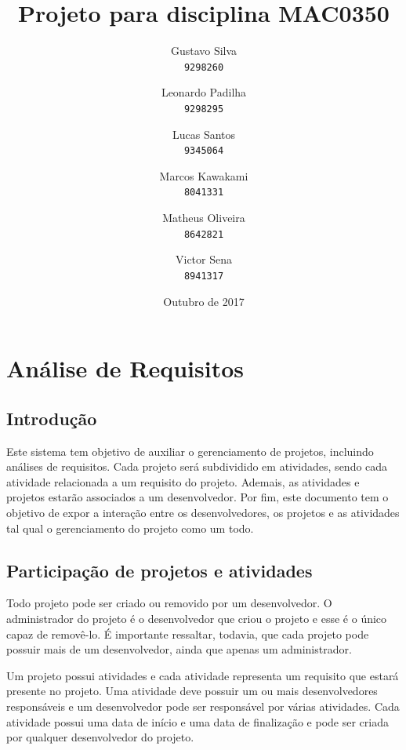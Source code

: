 \documentclass{article}
\title{Projeto para disciplina MAC0350}
\author{
	Gustavo Silva\\
	\texttt{9298260}
	\and
	Leonardo Padilha\\
	\texttt{9298295}
	\and
	Lucas Santos\\
	\texttt{9345064}
	\and
	Marcos Kawakami\\
	\texttt{8041331}
	\and
	Matheus Oliveira\\
	\texttt{8642821}
	\and
	Victor Sena\\
	\texttt{8941317}
}
\date{Outubro de 2017}
\begin{document}
\maketitle

\newpage

\tableofcontents

\newpage

\section{Análise de Requisitos}

	\subsection{Introdução}
	Este sistema tem objetivo de auxiliar o gerenciamento de projetos, incluindo análises de requisitos. Cada projeto será subdividido em atividades, sendo cada atividade relacionada a um requisito do projeto. Ademais, as atividades e projetos estarão associados a um desenvolvedor. Por fim, este documento tem o objetivo de expor a interação entre os desenvolvedores, os projetos e as atividades tal qual o gerenciamento do projeto como um todo.

	\subsection{Participação de projetos e atividades}
	Todo projeto pode ser criado ou removido por um desenvolvedor. O administrador do projeto é o desenvolvedor que criou o projeto e esse é o único capaz de removê-lo. É importante ressaltar, todavia, que cada projeto pode possuir mais de um desenvolvedor, ainda que apenas um administrador.

	Um projeto possui atividades e cada atividade representa um requisito que estará presente no projeto. Uma atividade deve possuir um ou mais desenvolvedores responsáveis e um desenvolvedor pode ser responsável por várias atividades. Cada atividade possui uma data de início e uma data de finalização e pode ser criada por qualquer desenvolvedor do projeto.
\end{document}
